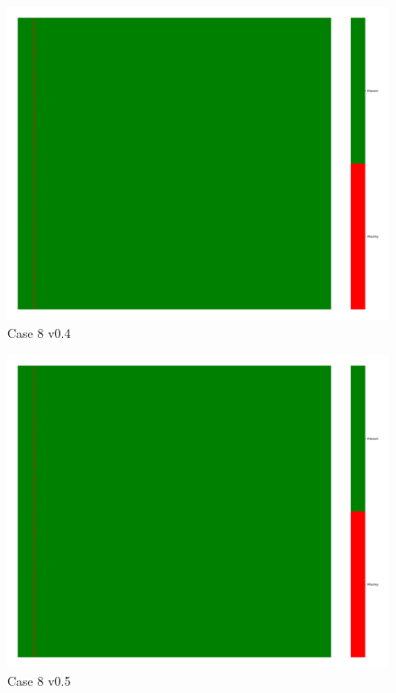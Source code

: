 \documentclass[a4paper,12pt]{article}
\begin{document}
\begin{figure}[H]
    \includegraphics[width=\linewidth]{case9_v0.4_heatmap_cleaned.png}
    \caption*{Case 8 v0.4}
\end{figure}

\begin{figure}[H]
    \includegraphics[width=\linewidth]{case9_v0.5_heatmap_cleaned.png}
    \caption*{Case 8 v0.5}
\end{figure}
\end{document}
